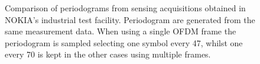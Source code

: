 \begin{figure}[H]
{			}\hfill
			\caption[]{\small Comparison of periodograms from sensing acquisitions obtained in NOKIA's industrial test facility.
				Periodogram are generated from the same measurement data. When using a single OFDM frame the periodogram is sampled selecting one symbol every 47, whilst one every 70 is kept in the other cases using multiple frames.  }
			\label{fig:TDD_artefacts}
		\end{figure}
		
		